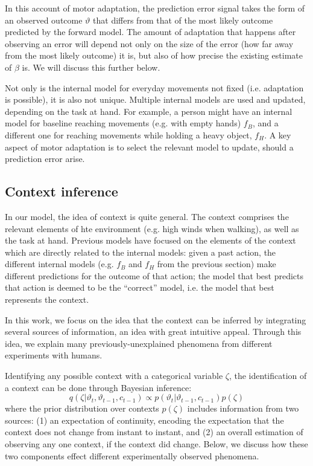 \documentclass[a4paper,doc,floatsintext,natbib]{apa6}
\begin{document}
In this account of motor adaptation, the prediction error signal takes the form of an observed outcome $\vartheta$ that differs from that of the most likely outcome predicted by the forward model. The amount of adaptation that happens after observing an error will depend not only on the size of the error (how far away from the most likely outcome) it is, but also of how precise the existing estimate of $\beta$ is. We will discuss this further below.

Not only is the internal model for everyday movements not fixed (i.e. adaptation is possible), it is also not unique. Multiple internal models are used and updated, depending on the task at hand. For example, a person might have an internal model for baseline reaching movements (e.g. with empty hands) $f_B$, and a different one for reaching movements while holding a heavy object, $f_H$. A key aspect of motor adaptation is to select the relevant model to update, should a prediction error arise.

\subsection{Context inference}
In our model, the idea of context is quite general. The context comprises the relevant elements of hte environment (e.g. high winds when walking), as well as the task at hand. Previous models have focused on the elements of the context which are directly related to the internal models: given a past action, the different internal models (e.g. $f_B$ and $f_H$ from the previous section) make different predictions for the outcome of that action; the model that best predicts that action is deemed to be the ``correct'' model, i.e. the model that best represents the context.

In this work, we focus on the idea that the context can be inferred by integrating several sources of information, an idea with great intuitive appeal. Through this idea, we explain many previously-unexplained phenomena from different experiments with humans.

Identifying any possible context with a categorical variable $\zeta$, the identification of a context can be done through Bayesian inference:
\begin{equation}
q(\zeta | \vartheta_t, \vartheta_{t-1}, c_{t-1}) \propto p(\vartheta_t | \vartheta_{t-1}, c_{t-1})p(\zeta)
\end{equation}
where the prior distribution over contexts $p(\zeta)$ includes information from two sources: (1) an expectation of continuity, encoding the expectation that the context does not change from instant to instant, and (2) an overall estimation of observing any one context, if the context did change. Below, we discuss how these two components effect different experimentally observed phenomena.
\end{document}
